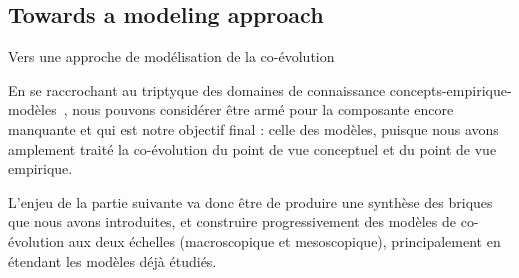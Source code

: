 \subsection*{Towards a modeling approach}{Vers une approche de modélisation de la co-évolution}


En se raccrochant au triptyque des domaines de connaissance concepts-empirique-modèles~\cite{livet2010}, nous pouvons considérer être armé pour la composante encore manquante et qui est notre objectif final : celle des modèles, puisque nous avons amplement traité la co-évolution du point de vue conceptuel et du point de vue empirique. 


L'enjeu de la partie suivante va donc être de produire une synthèse des briques que nous avons introduites, et construire progressivement des modèles de co-évolution aux deux échelles (macroscopique et mesoscopique), principalement en étendant les modèles déjà étudiés.












